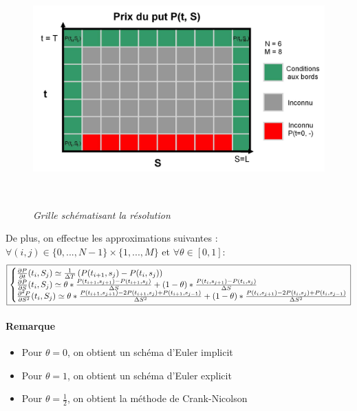 \documentclass[10pt]{article}
\makeatletter
\newenvironment{sistema}%
{\left\lbrace\begin{array}{@{}l@{}}}%
  {\end{array}\right.}
\makeatother
\begin{document}
  \begin{figure}[H]
    \begin{center}
      \includegraphics[height=9cm,keepaspectratio]{./images/edp.jpg}
    \end{center}
    \caption{\textit{Grille schématisant la résolution}}
    \label{grille}
  \end{figure}
  
  De plus, on effectue les approximations suivantes : $\forall (i, j) \in \{0, ..., N-1\} \times \{1, ..., M\}$ et $\forall \theta \in [0, 1]$:          
  $$
  \boxed{
    \begin{sistema}
      \frac{\partial P}{\partial t}(t_i, S_j) \simeq \frac{1}{\Delta T}\left(P(t_{i + 1}, s_j) - P(t_i, s_j)\right)\\
      \frac{\partial P}{\partial S}(t_i, S_j) \simeq \theta * \frac{P(t_{i + 1}, s_{j + 1}) - P(t_{i + 1}, s_j)}{\Delta S} + (1 - \theta) * \frac{P(t_i, s_{j + 1}) - P(t_i, s_j)}{\Delta S}\\
      \frac{\partial^2 P}{\partial S^2}(t_i, S_j) \simeq \theta * \frac{P(t_{i + 1}, s_{j + 1}) - 2P(t_{i + 1}, s_j) + P(t_{i + 1}, s_{j-1})}{\Delta S^2} + (1 - \theta) * \frac{P(t_{i}, s_{j + 1}) - 2P(t_{i}, s_j) + P(t_{i}, s_{j-1})}{\Delta S^2}
    \end{sistema}
  }
  $$
  \paragraph{Remarque}
  \begin{itemize}[label=-]
    \item Pour $\theta = 0$, on obtient un schéma d'Euler implicit
    \item Pour $\theta = 1$, on obtient un schéma d'Euler explicit
    \item Pour $\theta = \frac{1}{2}$, on obtient la méthode de Crank-Nicolson
  \end{itemize}
  
\end{document}
